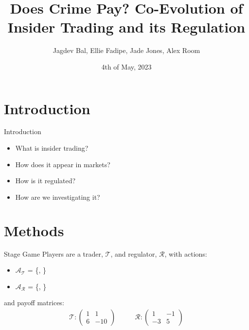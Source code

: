 \documentclass{beamer}
\title{Does Crime Pay? Co-Evolution of Insider Trading and its Regulation}
\author{Jagdev Bal, Ellie Fadipe, Jade Jones, Alex Room}
\date{4th of May, 2023}
\begin{document}
\begin{frame}
\titlepage
\end{frame}


\section{Introduction}
\begin{frame}{Introduction}
\begin{itemize}
    \item What is insider trading?
    \item How does it appear in markets?
    \item How is it regulated?
    \item How are we investigating it?
\end{itemize}
\end{frame}


\section{Methods}
\begin{frame}{Stage Game}
Players are a trader, $\mathcal{T}$, and regulator, $\mathcal{R}$, with actions:
\begin{itemize}
\item $\mathcal{A}_\mathcal{T}$ = \{, \}
\item $\mathcal{A}_\mathcal{R}$ = \{, \}
\end{itemize}

and payoff matrices:
\begin{equation*}
\begin{split}
    \mathcal{T}: 
    \begin{pmatrix}
    1 & 1 \\
    6 & -10
    \end{pmatrix}
\end{split}
\quad\quad
\begin{split}
    \mathcal{R}: 
    \begin{pmatrix}
    1 & -1 \\
    -3 & 5
    \end{pmatrix}
\end{split}
\end{equation*}

\end{frame}
\end{document}
